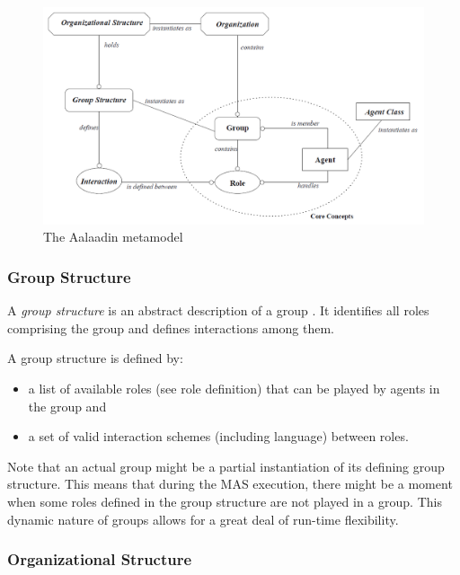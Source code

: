 \begin{figure}[h]
	\centering
	\includegraphics[width=\textwidth]{images/aalaadin/aalaadin-metamodel.png}
	\caption{The Aalaadin metamodel \cite{Ferber97}}
	\label{figure:aalaadin-metamodel}
\end{figure}

\subsubsection*{Group Structure}

A \textit{group structure} is an abstract description of a group \cite{Ferber97}.
It identifies all roles comprising the group and defines interactions among them.

A group structure is defined by:
\begin{itemize}
	\item a list of available roles (see role definition) that can be played by agents in the group and
	\item a set of valid interaction schemes (including language) between roles.
\end{itemize}

Note that an actual group might be a partial instantiation of its defining group structure.
This means that during the MAS execution, there might be a moment when some roles defined in the group structure are not played in a group.
This dynamic nature of groups allows for a great deal of run-time flexibility.

\subsubsection*{Organizational Structure}

